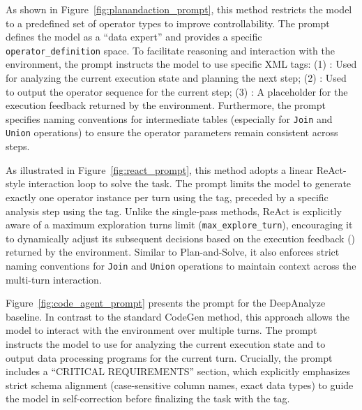 As shown in Figure~\ref{fig:planandaction_prompt}, this method restricts the model to a predefined set of operator types to improve controllability.
The prompt defines the model as a ``data expert'' and provides a specific \texttt{operator\_definition} space.
To facilitate reasoning and interaction with the environment, the prompt instructs the model to use specific XML tags:
(1) : Used for analyzing the current execution state and planning the next step;
(2) : Used to output the operator sequence for the current step;
(3) : A placeholder for the execution feedback returned by the environment.
Furthermore, the prompt specifies naming conventions for intermediate tables (especially for \texttt{Join} and \texttt{Union} operations) to ensure the operator parameters remain consistent across steps.

As illustrated in Figure~\ref{fig:react_prompt}, this method adopts a linear ReAct-style interaction loop to solve the task.
The prompt limits the model to generate exactly one operator instance per turn using the  tag, preceded by a specific analysis step using the  tag.
Unlike the single-pass methods, ReAct is explicitly aware of a maximum exploration turns limit (\texttt{max\_explore\_turn}), encouraging it to dynamically adjust its subsequent decisions based on the execution feedback () returned by the environment.
Similar to Plan-and-Solve, it also enforces strict naming conventions for \texttt{Join} and \texttt{Union} operations to maintain context across the multi-turn interaction.

Figure~\ref{fig:code_agent_prompt} presents the prompt for the DeepAnalyze baseline.
In contrast to the standard CodeGen method, this approach allows the model to interact with the environment over multiple turns.
The prompt instructs the model to use  for analyzing the current execution state and  to output data processing programs for the current turn.
Crucially, the prompt includes a ``CRITICAL REQUIREMENTS'' section, which explicitly emphasizes strict schema alignment (\eg case-sensitive column names, exact data types) to guide the model in self-correction before finalizing the task with the  tag.

